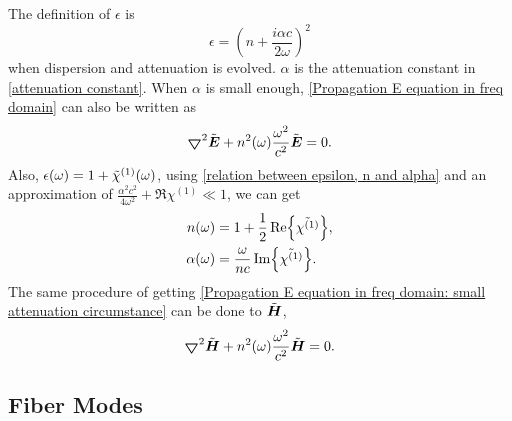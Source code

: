 \documentclass[12pt]{extarticle}
\numberwithin{equation}{section}
\numberwithin{figure}{section}
\numberwithin{table}{section}
\newcommand{\<}{\langle}
\renewcommand{\>}{\rangle}
\theoremstyle{definition}
\newcommand{\Lap}{\boldsymbol{\bigtriangledown}}
\begin{document}
        The definition of $\epsilon$ is
            \begin{equation}
                \epsilon = (n + \frac{i\alpha c}{2\omega})^2
                \label{relation between epsilon, n and alpha}
            \end{equation}
        when dispersion and attenuation is evolved. $\alpha$ is the attenuation constant in \autoref{attenuation constant}. When $\alpha$ is small enough, \autoref{Propagation E equation in freq domain} can also be written as
            \begin{equation}
                \label{Propagation E equation in freq domain: small attenuation circumstance}
                \Lap^2\Tilde{\boldsymbol{E}}+n^2(\omega)\frac{\omega^2}{c^2}\Tilde{\boldsymbol{E}}=0.
            \end{equation}
        Also, $\epsilon(\omega)=1+\Tilde{\chi}^{(1)}(\omega)$, using \autoref{relation between epsilon, n and alpha} and an approximation of $\frac{\alpha^2c^2}{4\omega^2}+\Re{\chi^{(1)}} \ll 1$, we can get
            \begin{subequations}
                \begin{align}
                    n(\omega) &= 1+\frac{1}{2}\Re{\Tilde{\chi^{(1)}}},\\
                    \alpha(\omega) &=\frac{\omega}{nc}\Im{\Tilde{\chi^{(1)}}}.
                \end{align}
            \end{subequations}
        The same procedure of getting \autoref{Propagation E equation in freq domain: small attenuation circumstance} can be done to $\Tilde{\boldsymbol{H}}$,
            \begin{equation}
                \label{Propagation H equation in freq domain: small attenuation circumstance}
                \Lap^2\Tilde{\boldsymbol{H}}+n^2(\omega)\frac{\omega^2}{c^2}\Tilde{\boldsymbol{H}}=0.
            \end{equation}
            
    \subsection{Fiber Modes}
\end{document}
